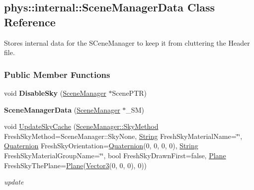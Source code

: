 \hypertarget{classphys_1_1internal_1_1SceneManagerData}{
\subsection{phys::internal::SceneManagerData Class Reference}
\label{classphys_1_1internal_1_1SceneManagerData}
}


Stores internal data for the SCeneManager to keep it from cluttering the Header file.  


\subsubsection*{Public Member Functions}
\begin{DoxyCompactItemize}
\item 
\hypertarget{classphys_1_1internal_1_1SceneManagerData_a40d62405f637531b7fd19b6c176c5a50}{
void {\bfseries DisableSky} (\hyperlink{classphys_1_1SceneManager}{SceneManager} $\ast$ScenePTR)}
\label{classphys_1_1internal_1_1SceneManagerData_a40d62405f637531b7fd19b6c176c5a50}

\item 
\hypertarget{classphys_1_1internal_1_1SceneManagerData_aedd570da5bdb027ec976e3c29137474c}{
{\bfseries SceneManagerData} (\hyperlink{classphys_1_1SceneManager}{SceneManager} $\ast$\_\-SM)}
\label{classphys_1_1internal_1_1SceneManagerData_aedd570da5bdb027ec976e3c29137474c}

\item 
\hypertarget{classphys_1_1internal_1_1SceneManagerData_a0e4db14de622e028e5bea383d37099ed}{
void \hyperlink{classphys_1_1internal_1_1SceneManagerData_a0e4db14de622e028e5bea383d37099ed}{UpdateSkyCache} (\hyperlink{classphys_1_1SceneManager_a91dd086aabaab926d070c65fc14828d6}{SceneManager::SkyMethod} FreshSkyMethod=SceneManager::SkyNone, \hyperlink{namespacephys_aa03900411993de7fbfec4789bc1d392e}{String} FreshSkyMaterialName=\char`\"{}\char`\"{}, \hyperlink{classphys_1_1Quaternion}{Quaternion} FreshSkyOrientation=\hyperlink{classphys_1_1Quaternion}{Quaternion}(0, 0, 0, 0), \hyperlink{namespacephys_aa03900411993de7fbfec4789bc1d392e}{String} FreshSkyMaterialGroupName=\char`\"{}\char`\"{}, bool FreshSkyDrawnFirst=false, \hyperlink{classphys_1_1Plane}{Plane} FreshSkyThePlane=\hyperlink{classphys_1_1Plane}{Plane}(\hyperlink{classphys_1_1Vector3}{Vector3}(0, 0, 0), 0))}
\label{classphys_1_1internal_1_1SceneManagerData_a0e4db14de622e028e5bea383d37099ed}

\begin{DoxyCompactList}\small\item\em update \item\end{DoxyCompactList}\end{DoxyCompactItemize}
